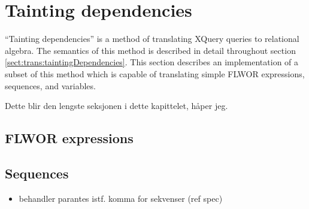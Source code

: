 \section{Tainting dependencies}
``Tainting dependencies'' is a method of translating XQuery queries to
relational algebra. The semantics of this method is described in detail
throughout section \ref{sect:trans:taintingDependencies}. This section
describes an implementation of a subset of this method which is capable of
translating simple FLWOR expressions, sequences, and variables. 

\label{sect:impl:tainting_deps}
Dette blir den lengste seksjonen i dette kapittelet, h\aa per jeg.
\subsection{FLWOR expressions}



\subsection{Sequences}
\label{sect:impl:td:seq}
\begin{itemize}
  \item behandler parantes istf. komma for sekvenser (ref spec) 
\end{itemize}